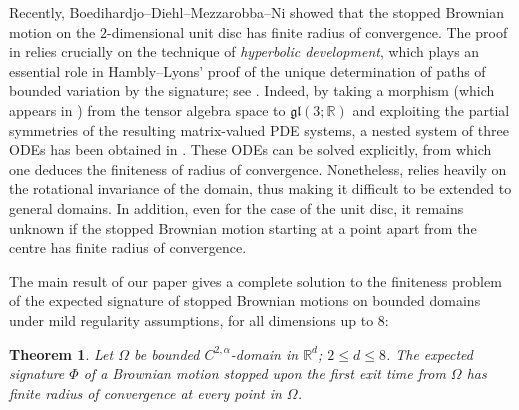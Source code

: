 \documentclass[11pt,a4paper,english,reqno]{amsart}
\theoremstyle{plain}
\newtheorem{theorem}[definition]{Theorem}
\newcommand{\R}{\mathbb{R}}
\newcommand{\1}{\mathbbm{1}}
\begin{document}
Recently, Boedihardjo--Diehl--Mezzarobba--Ni \cite{boedihardjo2021expected} showed that the  stopped Brownian motion on the $2$-dimensional unit disc has finite radius of convergence. The proof in \cite{boedihardjo2021expected} relies crucially  on the technique of \emph{hyperbolic development}, which plays an essential role in  Hambly--Lyons' proof  of the unique determination of paths of bounded variation by the signature; see  \cite{hl}. Indeed, by taking a morphism (which appears in \cite{hl}) from the tensor algebra space to  $\mathfrak{gl}(3;\R)$  and exploiting the partial symmetries of the resulting matrix-valued PDE systems,  a nested system of three ODEs has been obtained in \cite{boedihardjo2021expected}. These ODEs can be solved explicitly, from which one deduces the finiteness of radius of convergence. Nonetheless,  \cite{boedihardjo2021expected} relies heavily on the rotational invariance of the domain, thus making it difficult to be extended to general domains. In addition, even for the case of the unit disc, it remains unknown if the stopped Brownian motion starting at a point apart from the centre has finite radius of convergence.



The main result of our paper gives a complete solution to the finiteness problem of the expected signature of stopped Brownian motions on bounded domains under mild regularity assumptions, for all dimensions up to $8$:
\begin{theorem}\label{thm: main}
Let $\Omega$ be bounded  $C^{2,\alpha}$-domain in $\R^d$; $2 \leq d \leq 8$. The expected signature $\Phi$ of a Brownian motion stopped upon the first exit time from $\Omega$ has finite radius of convergence at every point in $\Omega$. 
\end{theorem}
\end{document}
